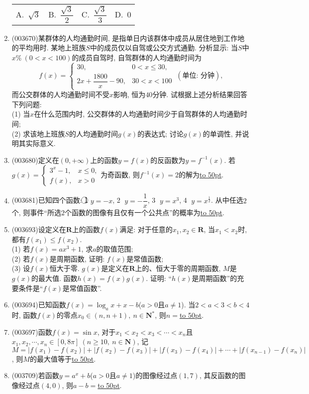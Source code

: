 \documentclass[10pt,a4paper]{article}
\newcommand{\blank}[1]{\underline{\hbox to #1pt{}}}
\newcommand{\fourch}[4]{\par\begin{tabular}{p{.23\textwidth}p{.23\textwidth}p{.23\textwidth}p{.23\textwidth}}
A.~#1 &B.~#2& C.~#3& D.~#4
\end{tabular}}
\begin{document}
\begin{enumerate}[1.]
\fourch{$\sqrt{3}$}{$\dfrac{\sqrt{3}}{2}$}{$\dfrac{\sqrt{3}}{3}$}{$0$}
\item {\tiny (003670)}某群体的人均通勤时间, 是指单日内该群体中成员从居住地到工作地的平均用时. 某地上班族$S$中的成员仅以自驾或公交方式通勤. 分析显示: 当$S$中$x\% \ (0<x<100)$的成员自驾时, 自驾群体的人均通勤时间为
$$f(x)=\begin{cases}
30, & 0<x \le 30,\\ 2x+\dfrac{1800}{x}-90, & 30<x<100\end{cases} \ (\text{单位: 分钟}),$$
而公交群体的人均通勤时间不受$x$影响, 恒为$40$分钟. 试根据上述分析结果回答下列问题:\\
(1) 当$x$在什么范围内时, 公交群体的人均通勤时间少于自驾群体的人均通勤时间;\\
(2) 求该地上班族$S$的人均通勤时间$g(x)$的表达式; 讨论$g(x)$的单调性, 并说明其实际意义.
\item {\tiny (003680)}定义在$(0,+\infty)$上的函数$y=f(x)$的反函数为$y=f^{-1}(x)$. 若$g(x)=\begin{cases}3^x-1, & x\le 0,\\ f(x), & x>0\end{cases}$为奇函数, 则$f^{-1}(x)=2$的解为\blank{50}.
\item {\tiny (003681)}已知四个函数: \textcircled{1} $y=-x$, \textcircled{2} $y=-\dfrac{1}{x}$, \textcircled{3} $y=x^3$, \textcircled{4} $y=x^{\frac{1}{2}}$. 从中任选$2$个, 则事件``所选$2$个函数的图像有且仅有一个公共点''的概率为\blank{50}.
\item {\tiny (003693)}设定义在$\mathbf{R}$上的函数$f(x)$满足: 对于任意的$x_1,x_2\in \mathbf{R}$, 当$x_1<x_2$时, 都有$f(x_1)\le f(x_2)$.\\
(1) 若$f(x)=ax^3+1$, 求$a$的取值范围;\\
(2) 若$f(x)$是周期函数, 证明: $f(x)$是常值函数;\\
(3) 设$f(x)$恒大于零. $g(x)$是定义在$\mathbf{R}$上的、恒大于零的周期函数, $M$是$g(x)$的最大值. 函数$h(x)=f(x)g(x)$. 证明: ``$h(x)$是周期函数''的充要条件是``$f(x)$是常值函数''.
\item {\tiny (003694)}已知函数$f(x)=\log_a x+x-b$($a>0$且$a\ne 1$). 当$2<a<3<b<4$时, 函数$f(x)$的零点$x_0\in (n,n+1), \ n\in \mathbf{N}^*$, 则$n=$\blank{50}.
\item {\tiny (003697)}函数$f(x)=\sin x$, 对于$x_1<x_2<x_3<\cdots<x_n$且$x_1,x_2,\cdots,x_n\in [0,8\pi] \ (n\ge 10, \ n\in \mathbf{N})$, 记$M=|f(x_1)-f(x_2) |+|f(x_2)-f(x_3)|+|f(x_3)-f(x_4)|+\cdots+| f(x_{n-1})-f(x_n)|$, 则$M$的最大值等于\blank{50}.
\item {\tiny (003709)}若函数$y=a^x+b$($a>0$且$a\ne 1$)的图像经过点$(1,7)$, 其反函数的图像经过点$(4,0)$, 则$a-b=$\blank{50}.

\end{enumerate}
\end{document}
